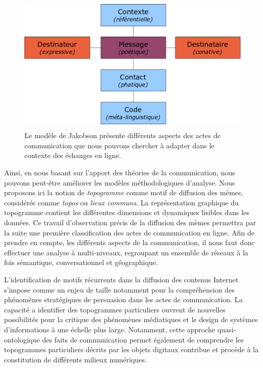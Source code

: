 \begin{figure}[htpb]
    \centering

    \includegraphics[width=4.6894in,height=2.6114in]{figures/chap3/chapitre3-img5.png}

    \caption[Modèle de Jakobson]{ Le modèle de Jakobson présente différents aspects des actes de communication que nous pouvons chercher à adapter dans le contexte des échanges en ligne.}
    \label{fig:jakobson}

\end{figure}

Ainsi, en nous basant sur l'apport des théories de la communication, nous pouvons peut-\^etre améliorer les modèles méthodologiques d{\textquoteright}analyse. Nous proposons ici la notion de \textit{topogramme} comme motif de diffusion des mèmes, considérés comme \textit{topos} ou \textit{lieux communs}. La représentation graphique du topogramme contient les différentes dimensions et dynamiques lisibles dans les données. Ce travail d'observation précis de la diffusion des mèmes permettra par la suite une première classification des actes de communication en ligne. Afin de prendre en compte, les différents aspects de la communication, il nous faut donc effectuer une analyse à multi-niveaux, regroupant un ensemble de réseaux à la fois sémantique, conversationnel et géographique.

L’identification de motifs récurrents dans la diffusion des contenus Internet s'impose comme un enjeu de taille notamment pour la compréhension des phénomènes stratégiques de persuasion dans les actes de communication. La capacité a identifier des topogrammes particuliers ouvrent de nouvelles possibilités pour la critique des phénomènes médiatiques et le design de systèmes d’informations à une échelle plus large. Notamment, cette approche quasi-ontologique des faits de communication permet également de comprendre les topogrammes particuliers décrits par les objets digitaux contribue et procède à la constitution de différents milieux numériques.